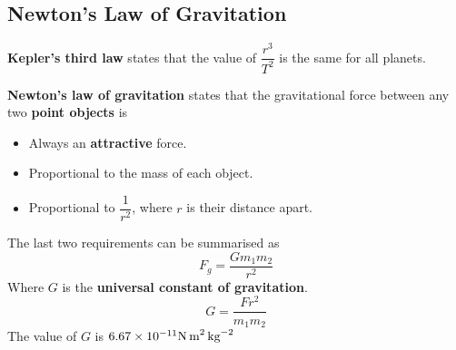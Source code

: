 \subsection{Newton's Law of Gravitation}

\textbf{Kepler's third law} states that the value of $\dfrac{r^3}{T^2}$ is the same for all planets.

\textbf{Newton's law of gravitation} states that the gravitational force between any two \textbf{point objects} is
\begin{itemize}
    \item Always an \textbf{attractive} force.
    \item Proportional to the mass of each object.
    \item Proportional to $\dfrac{1}{r^2}$, where $r$ is their distance apart.
\end{itemize}

The last two requirements can be summarised as
$$F_g=\frac{Gm_1m_2}{r^2}$$
Where $G$ is the \textbf{universal constant of gravitation}.
$$G=\frac{Fr^2}{m_1m_2}$$
The value of $G$ is $6.67\times10^{-11}\text{N\,m}^2\,\text{kg}^{-2}$
